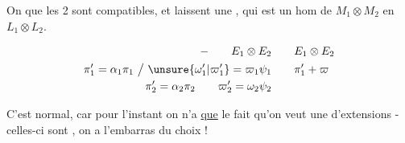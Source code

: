 On  que les 2   sont compatibles, et laissent une , qui est un hom de $M_1\otimes M_2$ en $L_1\otimes L_2$.

\[
\begin{aligned}
-\qquad E_1\otimes E_2 &\qquad E_1\otimes E_2\\
\pi'_1=\alpha_1\pi_1\ \big/\ \unsure{\omega'_1|\varpi'_1}=\varpi_1\psi_1&\qquad \pi'_1+\varpi\\
\pi'_2=\alpha_2\pi_2\qquad\varpi'_2=\omega_2\psi_2&
\end{aligned}
\]

C'est normal, car pour l'instant on n'a  \uline{que} le fait qu'on veut une  d'extensions -  celles-ci sont , on a l'embarras du choix !
